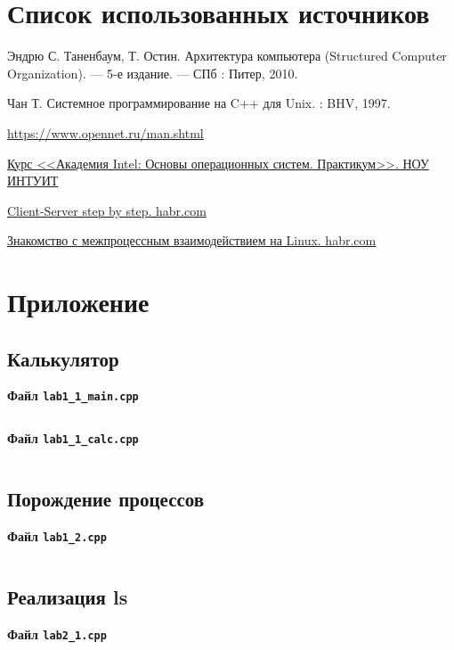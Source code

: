 \documentclass[a4paper,14pt]{extarticle}
\begin{document}
\newpage

\section{Список использованных источников}
Эндрю С. Таненбаум, Т. Остин. Архитектура компьютера (Structured Computer Organization). --- 5-е издание. --- СПб : Питер, 2010.

Чан Т. Системное программирование на C++ для Unix. : BHV, 1997.

\href{https://www.opennet.ru/man.shtml}{https://www.opennet.ru/man.shtml}

\href{https://intuit.ru/academies/companiesn/41/info}{Курс <<Академия Intel: Основы операционных систем. Практикум>>. НОУ ИНТУИТ}

\href{https://habr.com/ru/post/330676/}{Client-Server step by step. habr.com}

\href{https://habr.com/ru/post/122108/}{Знакомство с межпроцессным взаимодействием на Linux. habr.com}

\newpage

\section{Приложение}

\subsection{Калькулятор}\label{code:lab1_1}
\centerline{\textbf{Файл \texttt{lab1\_1\_main.cpp}}}

\inputminted{octave}{lab11main.cpp}

\centerline{\textbf{Файл \texttt{lab1\_1\_calc.cpp}}}

\inputminted{octave}{lab11calc.cpp}

\subsection{Порождение процессов}\label{code:lab1_2}
\centerline{\textbf{Файл \texttt{lab1\_2.cpp}}}

\inputminted{octave}{lab12.cpp}

\subsection{Реализация ls}\label{code:lab2_1}
\centerline{\textbf{Файл \texttt{lab2\_1.cpp}}}

\inputminted{octave}{lab21.cpp}
\end{document}

